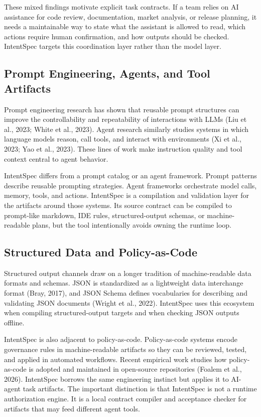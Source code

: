 \documentclass[11pt]{article}
\begin{document}
These mixed findings motivate explicit task contracts. If a team relies on AI
assistance for code review, documentation, market analysis, or release planning, it
needs a maintainable way to state what the assistant is allowed to read, which
actions require human confirmation, and how outputs should be checked. IntentSpec
targets this coordination layer rather than the model layer.

\subsection{Prompt Engineering, Agents, and Tool Artifacts}

Prompt engineering research has shown that reusable prompt structures can improve
the controllability and repeatability of interactions with LLMs (Liu et al., 2023;
White et al., 2023). Agent research similarly studies systems in which language
models reason, call tools, and interact with environments (Xi et al., 2023; Yao et
al., 2023). These lines of work make instruction quality and tool context central to
agent behavior.

IntentSpec differs from a prompt catalog or an agent framework. Prompt patterns
describe reusable prompting strategies. Agent frameworks orchestrate model calls,
memory, tools, and actions. IntentSpec is a compilation and validation layer for the
artifacts around those systems. Its source contract can be compiled to prompt-like
markdown, IDE rules, structured-output schemas, or machine-readable plans, but the
tool intentionally avoids owning the runtime loop.

\subsection{Structured Data and Policy-as-Code}

Structured output channels draw on a longer tradition of machine-readable data
formats and schemas. JSON is standardized as a lightweight data interchange format
(Bray, 2017), and JSON Schema defines vocabularies for describing and validating
JSON documents (Wright et al., 2022). IntentSpec uses this ecosystem when compiling
structured-output targets and when checking JSON outputs offline.

IntentSpec is also adjacent to policy-as-code. Policy-as-code systems encode
governance rules in machine-readable artifacts so they can be reviewed, tested, and
applied in automated workflows. Recent empirical work studies how policy-as-code is
adopted and maintained in open-source repositories (Foalem et al., 2026). IntentSpec
borrows the same engineering instinct but applies it to AI-agent task artifacts. The
important distinction is that IntentSpec is not a runtime authorization engine. It
is a local contract compiler and acceptance checker for artifacts that may feed
different agent tools.
\end{document}

